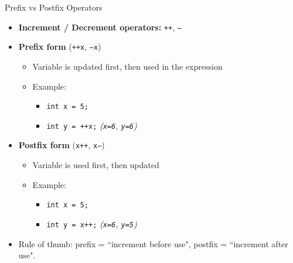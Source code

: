 \documentclass[12pt, aspectratio=169]{beamer}
\begin{document}
    \begin{frame}{Prefix vs Postfix Operators}
        \begin{itemize}
            \item \textbf{Increment / Decrement operators:} \texttt{++}, \texttt{--}
            \item \textbf{Prefix form} (\texttt{++x}, \texttt{--x})
                \begin{itemize}
                    \item Variable is updated first, then used in the expression
                    \item Example: 
                        \begin{itemize}
                            \item \texttt{int x = 5;}
                            \item \texttt{int y = ++x;} \hfill \emph{(\texttt{x=6}, \texttt{y=6})}
                        \end{itemize}
                \end{itemize}
            \item \textbf{Postfix form} (\texttt{x++}, \texttt{x--})
                \begin{itemize}
                    \item Variable is used first, then updated
                    \item Example: 
                        \begin{itemize}
                            \item \texttt{int x = 5;}
                            \item \texttt{int y = x++;} \hfill \emph{(\texttt{x=6}, \texttt{y=5})}
                        \end{itemize}
                \end{itemize}
            \item Rule of thumb: prefix = ``increment before use", postfix = ``increment after use".
        \end{itemize}
    \end{frame}
\end{document}
